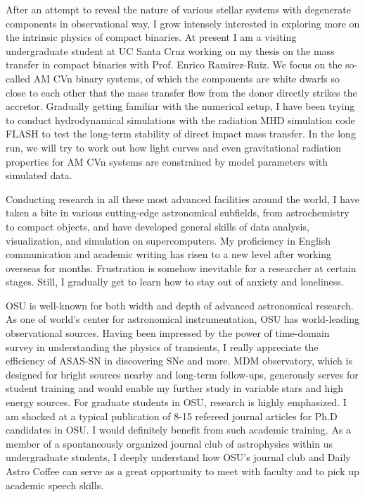 \documentclass[11pt, a4paper]{awesome-cv} %
\begin{document}
\begin{cvletter}
After an attempt to reveal the nature of various stellar systems with degenerate components in observational way, I grow intensely interested in exploring more on the intrinsic physics of compact binaries. At present I am a visiting undergraduate student at UC Santa Cruz working on my thesis on the mass transfer in compact binaries with Prof. Enrico Ramirez-Ruiz. We focus on the so-called AM CVn binary systems, of which the components are white dwarfs so close to each other that the mass transfer flow from the donor directly strikes the accretor. Gradually getting familiar with the numerical setup, I have been trying to conduct hydrodynamical simulations with the radiation MHD simulation code FLASH to test the long-term stability of direct impact mass transfer. In the long run, we will try to work out how light curves and even gravitational radiation properties for AM CVn systems are constrained by model parameters with simulated data.

Conducting research in all these most advanced facilities around the world, I have taken a bite in various cutting-edge astronomical subfields, from astrochemistry to compact objects, and have developed general skills of data analysis, visualization, and simulation on supercomputers. My proficiency in English communication and academic writing has risen to a new level after working overseas for months. Frustration is somehow inevitable for a researcher at certain stages. Still, I gradually get to learn how to stay out of anxiety and loneliness.


OSU is well-known for both width and depth of advanced astronomical research. As one of world's center for astronomical instrumentation, OSU has world-leading observational sources. Having been impressed by the power of time-domain survey in understanding the physics of transients, I really appreciate the efficiency of ASAS-SN in discovering SNe and more. MDM observatory, which is designed for bright sources nearby and long-term follow-ups, generously serves for student training and would enable my further study in variable stars and high energy sources. For graduate students in OSU, research is highly emphasized. I am shocked at a typical publication of 8-15 refereed journal articles for Ph.D candidates in OSU. I would definitely benefit from such academic training. As a member of a spontaneously organized journal club of astrophysics within us undergraduate students, I deeply understand how OSU's journal club and Daily Astro Coffee can serve as a great opportunity to meet with faculty and to pick up academic speech skills.


\end{cvletter}
\end{document}

